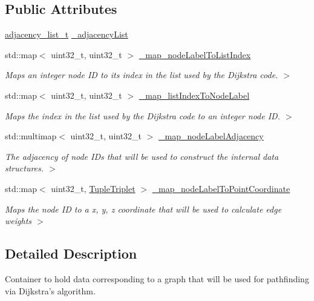 \subsection*{Public Attributes}
\begin{DoxyCompactItemize}
\item 
\hyperlink{dijkstraPathfinding_8h_a8c1d6029622c85b0c047b344a90a6f84}{adjacency\-\_\-list\-\_\-t} \hyperlink{classGraph_a18f350623c272fa0988f70c299895a8a}{\-\_\-adjacency\-List}
\item 
std\-::map$<$ uint32\-\_\-t, uint32\-\_\-t $>$ \hyperlink{classGraph_a56f4b3715081a555236768f48260caee}{\-\_\-map\-\_\-node\-Label\-To\-List\-Index}
\begin{DoxyCompactList}\small\item\em Maps an integer node I\-D to its index in the list used by the Dijkstra code. $>$ \end{DoxyCompactList}\item 
std\-::map$<$ uint32\-\_\-t, uint32\-\_\-t $>$ \hyperlink{classGraph_a991d6f0ebad396b5acfc10b6787530ec}{\-\_\-map\-\_\-list\-Index\-To\-Node\-Label}
\begin{DoxyCompactList}\small\item\em Maps the index in the list used by the Dijkstra code to an integer node I\-D. $>$ \end{DoxyCompactList}\item 
std\-::multimap$<$ uint32\-\_\-t, uint32\-\_\-t $>$ \hyperlink{classGraph_abdd870b000b22aecd02ab84e18666914}{\-\_\-map\-\_\-node\-Label\-Adjacency}
\begin{DoxyCompactList}\small\item\em The adjacency of node I\-Ds that will be used to construct the internal data structures. $>$ \end{DoxyCompactList}\item 
std\-::map$<$ uint32\-\_\-t, \hyperlink{tupleTriplet_8h_a0cdd11cd4d27abbb7b778a8fee3b2397}{Tuple\-Triplet} $>$ \hyperlink{classGraph_ad4cf5d8f988e253e00aaa73a72810233}{\-\_\-map\-\_\-node\-Label\-To\-Point\-Coordinate}
\begin{DoxyCompactList}\small\item\em Maps the node I\-D to a x, y, z coordinate that will be used to calculate edge weights $>$ \end{DoxyCompactList}\end{DoxyCompactItemize}


\subsection{Detailed Description}
Container to hold data corresponding to a graph that will be used for pathfinding via Dijkstra's algorithm. 

